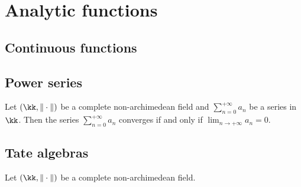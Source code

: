 \section{Analytic functions}

\subsection{Continuous functions}

\subsection{Power series}

    \begin{proposition}\label{prop:convergent_series_over_non_archimedean_fields}
        Let \((\kk,\|\cdot\|)\) be a complete non-archimedean field and \(\sum_{n=0}^{+\infty} a_n\) be a series in \(\kk\).
        Then the series \(\sum_{n=0}^{+\infty} a_n\) converges if and only if \(\lim_{n \to +\infty} a_n = 0\).
    \end{proposition}

\subsection{Tate algebras}

    \begin{definition}\label{def:Tate_algebra}
        Let \((\kk,\|\cdot\|)\) be a complete non-archimedean field.
    \end{definition}